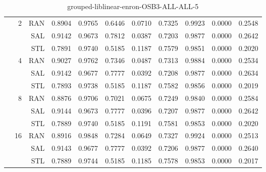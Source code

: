\begin{center}
\begin{table}[htbp]
\begin{tabular}{ | r | r | r | r | r | r | r | r | r | r | r |}
 & \multirow{3}{*}{2} & RAN & 0.8904 & 0.9765 & 0.6446 & 0.0710 & 0.7325 & 0.9923 & 0.0000 & 0.2548\\ \cline{3-11}
 &   & SAL & 0.9142 & 0.9673 & 0.7812 & 0.0387 & 0.7203 & 0.9877 & 0.0000 & 0.2642\\ \cline{3-11}
 &   & STL & 0.7891 & 0.9740 & 0.5185 & 0.1187 & 0.7579 & 0.9851 & 0.0000 & 0.2020\\ \cline{2-11}
 & \multirow{3}{*}{4} & RAN & 0.9027 & 0.9762 & 0.7346 & 0.0487 & 0.7313 & 0.9884 & 0.0000 & 0.2534\\ \cline{3-11}
 &   & SAL & 0.9142 & 0.9677 & 0.7777 & 0.0392 & 0.7208 & 0.9877 & 0.0000 & 0.2634\\ \cline{3-11}
 &   & STL & 0.7893 & 0.9738 & 0.5185 & 0.1187 & 0.7582 & 0.9856 & 0.0000 & 0.2019\\ \cline{2-11}
 & \multirow{3}{*}{8} & RAN & 0.8876 & 0.9706 & 0.7021 & 0.0675 & 0.7249 & 0.9840 & 0.0000 & 0.2584\\ \cline{3-11}
 &   & SAL & 0.9144 & 0.9673 & 0.7777 & 0.0396 & 0.7207 & 0.9877 & 0.0000 & 0.2642\\ \cline{3-11}
 &   & STL & 0.7889 & 0.9740 & 0.5185 & 0.1191 & 0.7581 & 0.9853 & 0.0000 & 0.2020\\ \cline{2-11}
 & \multirow{3}{*}{16} & RAN & 0.8916 & 0.9848 & 0.7284 & 0.0649 & 0.7327 & 0.9924 & 0.0000 & 0.2513\\ \cline{3-11}
 &   & SAL & 0.9143 & 0.9677 & 0.7777 & 0.0392 & 0.7206 & 0.9877 & 0.0000 & 0.2640\\ \cline{3-11}
 &   & STL & 0.7889 & 0.9744 & 0.5185 & 0.1185 & 0.7578 & 0.9853 & 0.0000 & 0.2017\\ \cline{2-11}
\hline
\end{tabular}
\caption{grouped-liblinear-enron-OSB3-ALL-ALL-5}
\end{table}
\end{center}

